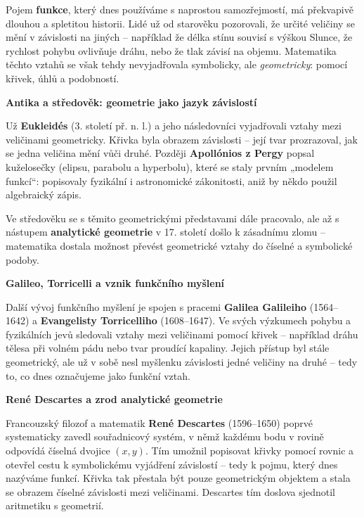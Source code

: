 \documentclass[12pt,a4paper]{article}
\begin{document}
\begin{historicalbox}
Pojem \textbf{funkce}, který dnes používáme s naprostou samozřejmostí, má překvapivě dlouhou a spletitou historii.  
Lidé už od starověku pozorovali, že určité veličiny se mění v závislosti na jiných – například že délka stínu souvisí s výškou Slunce, že rychlost pohybu ovlivňuje dráhu, nebo že tlak závisí na objemu.  
Matematika těchto vztahů se však tehdy nevyjadřovala symbolicky, ale \emph{geometricky}: pomocí křivek, úhlů a podobností.  

\medskip
\textbf{Antika a středověk: geometrie jako jazyk závislostí}

Už \textbf{Eukleidés} (3. století př. n. l.) a jeho následovníci vyjadřovali vztahy mezi veličinami geometricky.  
Křivka byla obrazem závislosti – její tvar prozrazoval, jak se jedna veličina mění vůči druhé.  
Později \textbf{Apollónios z Pergy} popsal kuželosečky (elipsu, parabolu a hyperbolu), které se staly prvním „modelem funkcí“:  
popisovaly fyzikální i astronomické zákonitosti, aniž by někdo použil algebraický zápis.  

Ve středověku se s těmito geometrickými představami dále pracovalo, ale až s nástupem \textbf{analytické geometrie} v 17. století došlo k zásadnímu zlomu – matematika dostala možnost převést geometrické vztahy do číselné a symbolické podoby.

\medskip
\textbf{Galileo, Torricelli a vznik funkčního myšlení}

Další vývoj funkčního myšlení je spojen s pracemi \textbf{Galilea Galileiho} (1564–1642) a \textbf{Evangelisty Torricelliho} (1608–1647).  
Ve svých výzkumech pohybu a fyzikálních jevů sledovali vztahy mezi veličinami pomocí křivek – například dráhu tělesa při volném pádu nebo tvar proudící kapaliny.  
Jejich přístup byl stále geometrický, ale už v sobě nesl myšlenku závislosti jedné veličiny na druhé – tedy to, co dnes označujeme jako funkční vztah.

\medskip
\textbf{René Descartes a zrod analytické geometrie}

Francouzský filozof a matematik \textbf{René Descartes} (1596–1650) poprvé systematicky zavedl souřadnicový systém, v němž každému bodu v rovině odpovídá číselná dvojice \((x, y)\).  
Tím umožnil popisovat křivky pomocí rovnic a otevřel cestu k symbolickému vyjádření závislostí – tedy k pojmu, který dnes nazýváme funkcí.  
Křivka tak přestala být pouze geometrickým objektem a stala se obrazem číselné závislosti mezi veličinami.  
Descartes tím doslova sjednotil aritmetiku s geometrií.


\end{historicalbox}
\end{document}
